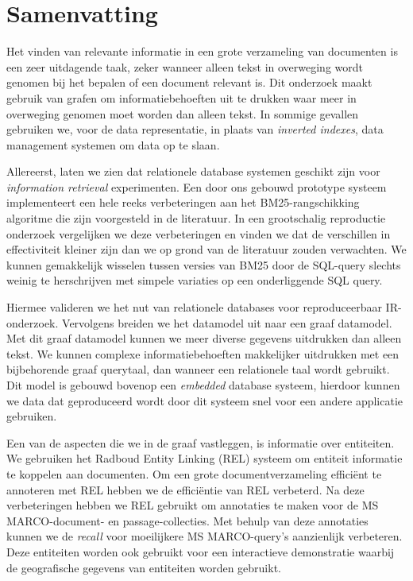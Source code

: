 \chapter*{Samenvatting}

Het vinden van relevante informatie in een grote verzameling van documenten is een zeer uitdagende taak, zeker wanneer alleen tekst in overweging wordt genomen bij het bepalen of een document relevant is. Dit onderzoek maakt gebruik van grafen om informatiebehoeften uit te drukken waar meer in overweging genomen moet worden dan alleen tekst. In sommige gevallen gebruiken we, voor de data representatie, in plaats van \emph{inverted indexes}, data management systemen om data op te slaan.

Allereerst, laten we zien dat relationele database systemen geschikt zijn voor \emph{information retrieval} experimenten.
Een door ons gebouwd prototype systeem implementeert een hele reeks verbeteringen aan het BM25-rangschikking algoritme die zijn voorgesteld in de literatuur. In een grootschalig reproductie onderzoek vergelijken we deze verbeteringen en vinden we dat de verschillen in effectiviteit kleiner zijn dan we op grond van de literatuur zouden verwachten. 
We kunnen gemakkelijk wisselen tussen versies van BM25 door de SQL-query slechts weinig te herschrijven met simpele variaties op een onderliggende SQL query. 

Hiermee valideren we het nut van relationele databases voor reproduceerbaar IR-onderzoek.
Vervolgens breiden we het datamodel uit naar een graaf datamodel. Met dit graaf datamodel kunnen we meer diverse gegevens uitdrukken dan alleen tekst. 
We kunnen complexe informatiebehoeften makkelijker uitdrukken met een bijbehorende graaf querytaal, dan wanneer een relationele taal wordt gebruikt. Dit model is gebouwd bovenop een \emph{embedded} database systeem, hierdoor kunnen we data dat geproduceerd wordt door dit systeem snel voor een andere applicatie gebruiken.

Een van de aspecten die we in de graaf vastleggen, is informatie over entiteiten. We gebruiken het Radboud Entity Linking (REL) systeem om entiteit informatie te koppelen aan documenten. Om een grote documentverzameling efficiënt te annoteren met REL hebben we de efficiëntie van REL verbeterd. Na deze verbeteringen hebben we REL gebruikt om annotaties te maken voor de MS MARCO-document- en passage-collecties. Met behulp van deze annotaties kunnen we de \emph{recall} voor moeilijkere MS MARCO-query's aanzienlijk verbeteren. Deze entiteiten worden ook gebruikt voor een interactieve demonstratie waarbij de geografische gegevens van entiteiten worden gebruikt.
